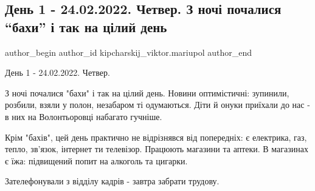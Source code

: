  
 
 
 
 

\subsection{День 1 - 24.02.2022. Четвер. З ночі почалися \enquote{бахи} і так на цілий день}
\label{sec:24_02_2023.fb.kipcharskij_viktor.mariupol.1.den_1_chetver_z_nochi_bahy}

\ifcmt
 author_begin
   author_id kipcharskij_viktor.mariupol
 author_end
\fi

День 1 - 24.02.2022. Четвер. 

З ночі почалися "бахи" і так на цілий день. Новини оптимістичні: зупинили,
розбили, взяли у полон, незабаром ті одумаються. Діти й онуки приїхали до нас -
в них на Волонтьоровці набагато гучніше.

Крім "бахів", цей день практично не відрізнявся від попередніх: є електрика,
газ, тепло, зв'язок, інтернет ти телевізор. Працюють магазини та аптеки. В
магазинах є їжа: підвищений попит на алкоголь та цигарки.

Зателефонували з відділу кадрів - завтра забрати трудову.

